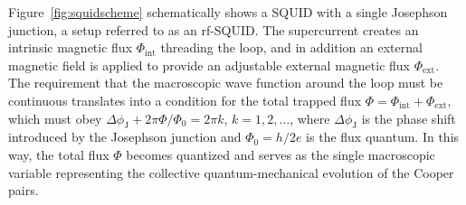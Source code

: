 \documentclass[3p,sort&compress,12pt]{elsarticle}
\begin{document}
Figure~\ref{fig:squidscheme} schematically shows a SQUID with a single Josephson junction, a setup referred to as an rf-SQUID. The supercurrent creates an intrinsic magnetic flux $\Phi_\text{int}$ threading the loop, and in addition an external magnetic field is applied to provide an adjustable external magnetic flux $\Phi_\text{ext}$. The requirement that the macroscopic wave function around the loop must be continuous translates into a condition for the total trapped flux $\Phi=\Phi_\text{int}+ \Phi_\text{ext}$, which must obey $\Delta \phi_\text{J} + 2\pi \Phi/\Phi_0 = 2\pi k$, $k=1,2,\hdots$, where $\Delta \phi_\text{J}$ is the phase shift introduced by the Josephson junction and $\Phi_0=h/2e$ is the flux quantum. In this way, the total flux $\Phi$ becomes quantized and serves as the single macroscopic variable representing the collective quantum-mechanical evolution of the Cooper pairs. 
\end{document}
